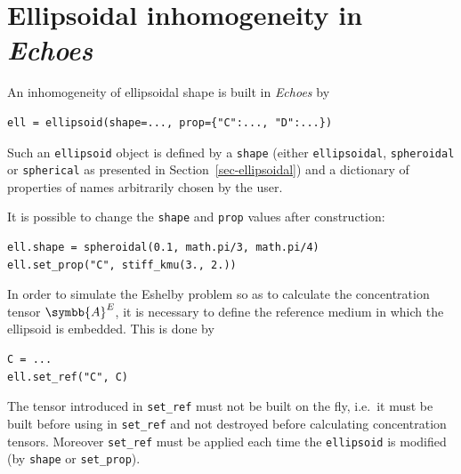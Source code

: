 \documentclass[
  a4paper,
  numbers=noendperiod,
  DIV=12]{scrreprt}
\newcommand{\uuuu}[1]{{\symbb{{#1}}}}
\begin{document}
\section{\texorpdfstring{Ellipsoidal inhomogeneity in
\emph{Echoes}}{Ellipsoidal inhomogeneity in Echoes}}\label{sec-ellipsoid}

An inhomogeneity of ellipsoidal shape is built in \emph{Echoes} by

\begin{verbatim}
ell = ellipsoid(shape=..., prop={"C":..., "D":...})
\end{verbatim}

Such an \texttt{ellipsoid} object is defined by a \texttt{shape} (either
\texttt{ellipsoidal}, \texttt{spheroidal} or \texttt{spherical} as
presented in Section~\ref{sec-ellipsoidal}) and a dictionary of
properties of names arbitrarily chosen by the user.

It is possible to change the \texttt{shape} and \texttt{prop} values
after construction:

\begin{verbatim}
ell.shape = spheroidal(0.1, math.pi/3, math.pi/4)
ell.set_prop("C", stiff_kmu(3., 2.))
\end{verbatim}

In order to simulate the Eshelby problem so as to calculate the
concentration tensor \(\uuuu{A}^E\), it is necessary to define the
reference medium in which the ellipsoid is embedded. This is done by

\begin{verbatim}
C = ...
ell.set_ref("C", C)
\end{verbatim}

\begin{tcolorbox}[enhanced jigsaw, arc=.35mm, bottomrule=.15mm, bottomtitle=1mm, breakable, colback=white, colbacktitle=quarto-callout-warning-color!10!white, colframe=quarto-callout-warning-color-frame, coltitle=black, left=2mm, leftrule=.75mm, opacityback=0, opacitybacktitle=0.6, rightrule=.15mm, title=\textcolor{quarto-callout-warning-color}{\faExclamationTriangle}\hspace{0.5em}{Warning}, titlerule=0mm, toprule=.15mm, toptitle=1mm]

The tensor introduced in \texttt{set\_ref} must not be built on the fly,
i.e.~it must be built before using in \texttt{set\_ref} and not
destroyed before calculating concentration tensors. Moreover
\texttt{set\_ref} must be applied each time the \texttt{ellipsoid} is
modified (by \texttt{shape} or \texttt{set\_prop}).

\end{tcolorbox}
\end{document}
